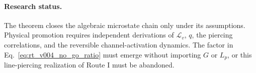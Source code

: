 \paragraph{Research status.}
The theorem closes the algebraic microstate chain only under its assumptions.
Physical promotion requires independent derivations of $\mathcal L_v$, $q$,
the piercing correlations, and the reversible channel-activation dynamics.
The factor in Eq.~\eqref{eq:rt_v004_no_go_ratio} must emerge without importing
$G$ or $L_p$, or this line-piercing realization of Route I must be abandoned.

